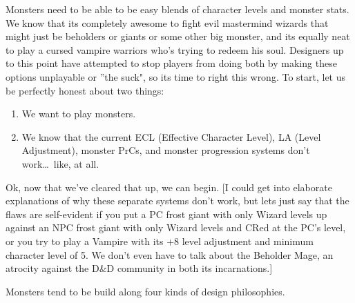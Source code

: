 Monsters need to be able to be easy blends of character levels and monster stats. We know that its completely awesome to fight evil mastermind wizards that might just be beholders or giants or some other big monster, and its equally neat to play a cursed vampire warriors who's trying to redeem his soul. Designers up to this point have attempted to stop players from doing both by making these options unplayable or ''the suck", so its time to right this wrong. To start, let us be perfectly honest about two things:

\begin{enumerate}\itemspace
   \item We want to play monsters.
   \item We know that the current ECL (Effective Character Level), LA (Level Adjustment), monster PrCs, and monster progression systems don't work\ldots\  like, at all.
\end{enumerate}

Ok, now that we've cleared that up, we can begin. [I could get into elaborate explanations of why these separate systems don't work, but lets just say that the flaws are self-evident if you put a PC frost giant with only Wizard levels up against an NPC frost giant with only Wizard levels and CRed at the PC's level, or you try to play a Vampire with its +8 level adjustment and minimum character level of 5. We don't even have to talk about the Beholder Mage, an atrocity against the D\&D community in both its incarnations.]

Monsters tend to be build along four kinds of design philosophies.

